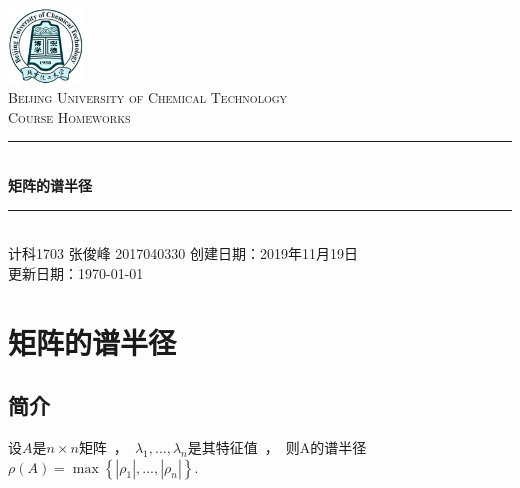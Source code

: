 \documentclass[cs4size,a4paper]{ctexart}
\numberwithin{equation}{section}
\numberwithin{table}{section}
\numberwithin{figure}{section}
\newcommand{\HRule}{\rule{\linewidth}{0.5mm}}
\begin{document}
\newtheorem{example}{例}              	%
\newtheorem{algorithem}{算法}	
\newtheorem{theorem}{定理}            	%
\newtheorem{definition}{定义}
\newtheorem{axiom}{公理}
\newtheorem{property}{性质}
\newtheorem{proposition}{命题}
\newtheorem{lemma}{引理}
\newtheorem{corollary}{推论}
\newtheorem{remark}{注解}
\newtheorem{condition}{条件}
\newtheorem{conclusion}{结论}
\newtheorem{assumption}{假设}
\renewcommand{\contentsname}{目录}     
\renewcommand{\abstractname}{摘要} 
\renewcommand{\refname}{参考文献}     
\renewcommand{\indexname}{索引}
\renewcommand{\figurename}{图}
\renewcommand{\tablename}{表}
\renewcommand{\appendixname}{附录}
\renewcommand{\proofname}{证明}
\renewcommand\emph[1]{\textcolor{red}{\textbf{#1}}}
\begin{titlepage}
\begin{center}
\includegraphics[width=0.15\textwidth]{logo}\\[1cm]    
\textsc{\Large Beijing University of Chemical Technology}\\[1.0cm]
\textsc{\Large Course Homeworks}\\[0.5cm]
\HRule \\[0.8cm]
{\huge \bfseries 矩阵的谱半径}\\[0.4cm]
\HRule \\[0.7cm]
\textsc{计科1703 张俊峰 2017040330}
\tableofcontents 
\vfill
{创建日期：2019年11月19日}\\
{更新日期：\today}
\end{center}
\end{titlepage}
\pagestyle{plain}
\thispagestyle{empty}
\pagestyle{fancy}

\section{矩阵的谱半径}
\subsection{简介}
设$ A $是$ n × n $矩阵~，~$ \lambda_1,...,\lambda_n $是其特征值~，~则A的谱半径$ \rho\left(A\right)=\max\left\{\left|\rho_1\right|,...,\left|\rho_n\right|\right\} .$
\end{document}
